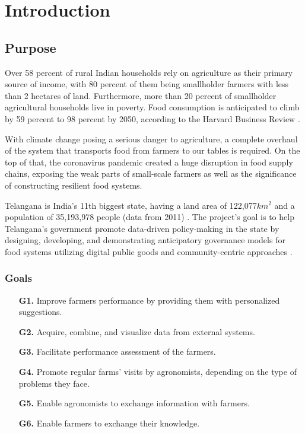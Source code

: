 \chapter{Introduction}

\section{Purpose}



Over 58 percent of rural Indian households rely on agriculture as their primary source of income, with 80 percent of them being smallholder farmers with less than 2 hectares of land. Furthermore, more than 20 percent of smallholder agricultural households live in poverty. Food consumption is anticipated to climb by 59 percent to 98 percent by 2050, according to the Harvard Business Review \cite{global_demand_for_food}.

With climate change posing a serious danger to agriculture, a complete overhaul of the system that transports food from farmers to our tables is required. On the top of that, the coronavirus pandemic created a huge disruption in food supply chains, exposing the weak parts of small-scale farmers as well as the significance of constructing resilient food systems.

Telangana is India's 11th biggest state, having a land area of 122,077$km^2$ and a population of 35,193,978 people (data from 2011) \cite{telangana}. The project's goal is to help Telangana’s government promote data-driven policy-making in the state by designing, developing, and demonstrating anticipatory governance models for food systems utilizing digital public goods and community-centric approaches \cite{reference_doc}.

\subsection{Goals} \label{subsec:goals}
\begin{itemize}
	\item [\textbf{G1.}] Improve farmers performance by providing them with personalized suggestions.
	\item [\textbf{G2.}] Acquire, combine, and visualize data from external systems. 
	\item [\textbf{G3.}] Facilitate performance assessment of the farmers.
	\item [\textbf{G4.}] Promote regular farms' visits by agronomists, depending on the type of problems they face.
	\item [\textbf{G5.}] Enable agronomists to exchange information with farmers.
	\item [\textbf{G6.}] Enable farmers to exchange their knowledge.
\end{itemize}

